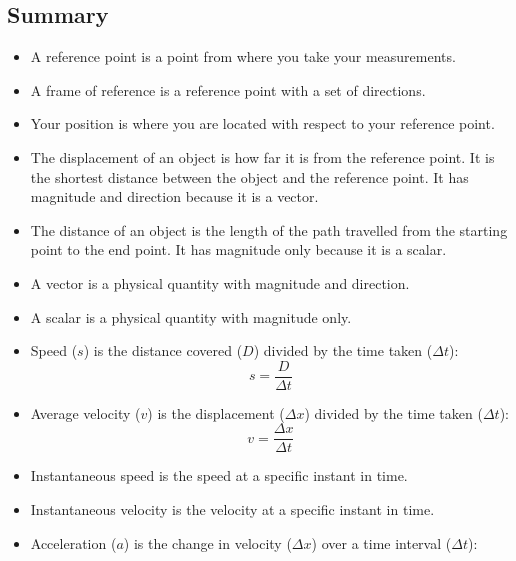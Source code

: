             \subsection{ Summary}
            \nopagebreak
      \label{m38796*id80622}\begin{itemize}[noitemsep]
            \label{m38796*uid154}\item A reference point is a point from where you take your measurements.
\label{m38796*uid155}\item A frame of reference is a reference point with a set of directions.
\label{m38796*uid156}\item Your position is where you are located with respect to your reference point.
\label{m38796*uid157}\item The displacement of an object is how far it is from the reference point. It is the shortest distance between the object and the reference point. It has magnitude and direction because it is a vector.
\label{m38796*uid158}\item The distance of an object is the length of the path travelled from the starting point to the end point. It has magnitude only because it is a scalar.
\label{m38796*uid159}\item A vector is a physical quantity with magnitude and direction.
\label{m38796*uid160}\item A scalar is a physical quantity with magnitude only.
\label{m38796*uid161}\item Speed ($s$) is the distance covered ($D$) divided by the time taken ($\Delta t$):
\label{m38796*id80758}\nopagebreak\noindent{}
    \begin{equation}
    s=\frac{D}{\Delta t}
      \end{equation}
    \label{m38796*uid162}\item Average velocity ($v$) is the displacement ($\Delta x$) divided by the time taken ($\Delta t$):
\label{m38796*id80827}\nopagebreak\noindent{}
    \begin{equation}
    v=\frac{\Delta x}{\Delta t}
      \end{equation}
    \label{m38796*uid163}\item Instantaneous speed is the speed at a specific instant in time.
\label{m38796*uid164}\item Instantaneous velocity is the velocity at a specific instant in time.
\label{m38796*uid165}\item Acceleration ($a$) is the change in velocity ($\Delta x$) over a time interval ($\Delta t$):

\end{itemize}
